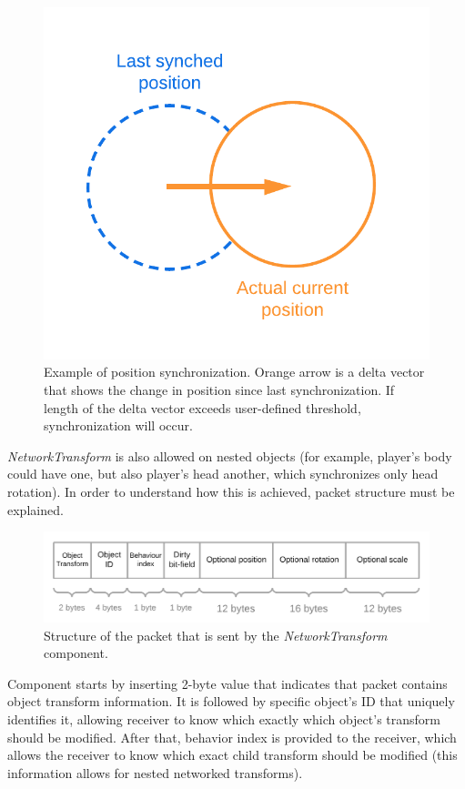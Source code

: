 \documentclass[times, utf8, diplomski]{fer}
\begin{document}
\begin{figure}[H]
	\centering
	\includegraphics[scale=0.3]{NetworkTransform-position-diagram}
	\caption{Example of position synchronization. Orange arrow is a delta vector that shows the change in position since last synchronization. If length of the delta vector exceeds user-defined threshold, synchronization will occur.}
\end{figure}

\textit{NetworkTransform} is also allowed on nested objects (for example, player's body could have one, but also player's head another, which synchronizes only head rotation). In order to understand how this is achieved, packet structure must be explained.

\begin{figure}[H]
	\centering
	\includegraphics[scale=0.25]{NetworkTransform-packet-structure}
	\caption{Structure of the packet that is sent by the \textit{NetworkTransform} component.}
\end{figure}

Component starts by inserting 2-byte value that indicates that packet contains object transform information. It is followed by specific object's ID that uniquely identifies it, allowing receiver to know which exactly which object's transform should be modified. After that, behavior index is provided to the receiver, which allows the receiver to know which exact child transform should be modified (this information allows for nested networked transforms).\\
\end{document}
